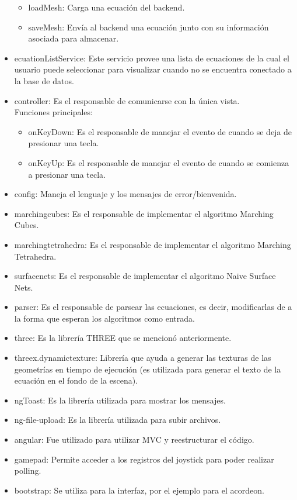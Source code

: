\documentclass[12pt]{article}
\begin{document}
\begin{itemize}
\begin{itemize}
	\item loadMesh: Carga una ecuación del backend.
	\item saveMesh: Envía al backend una ecuación junto con su información asociada para almacenar.
	\end{itemize}
\item ecuationListService: Este servicio provee una lista de ecuaciones de la cual el usuario puede seleccionar para visualizar cuando no se encuentra conectado a la base de datos.
\item controller: Es el responsable de comunicarse con la única vista.
	\\Funciones principales:
	\begin{itemize}
	\item onKeyDown: Es el responsable de manejar el evento de cuando se deja de presionar una tecla.
	\item onKeyUp: Es el responsable de manejar el evento de cuando se comienza a presionar una tecla.
	\end{itemize}
\item config: Maneja el lenguaje y los mensajes de error/bienvenida.
\item marchingcubes: Es el responsable de implementar el algoritmo Marching Cubes.
\item marchingtetrahedra: Es el responsable de implementar el algoritmo Marching Tetrahedra.
\item surfacenets: Es el responsable de implementar el algoritmo Naive Surface Nets.
\item parser: Es el responsable de parsear las ecuaciones, es decir, modificarlas de a la forma que esperan los algoritmos como entrada.
\item three: Es la librería THREE que se mencionó anteriormente.
\item threex.dynamictexture: Librería que ayuda a generar las texturas de las geometrías en tiempo de ejecución (es utilizada para generar el texto de la ecuación en el fondo de la escena).
\item ngToast: Es la librería utilizada para mostrar los mensajes.
\item ng-file-upload: Es la librería utilizada para subir archivos.
\item angular: Fue utilizado para utilizar MVC y reestructurar el código.
\item gamepad: Permite acceder a los registros del joystick para poder realizar polling.
\item bootstrap: Se utiliza para la interfaz, por el ejemplo para el acordeon.

\end{itemize}
\end{document}
